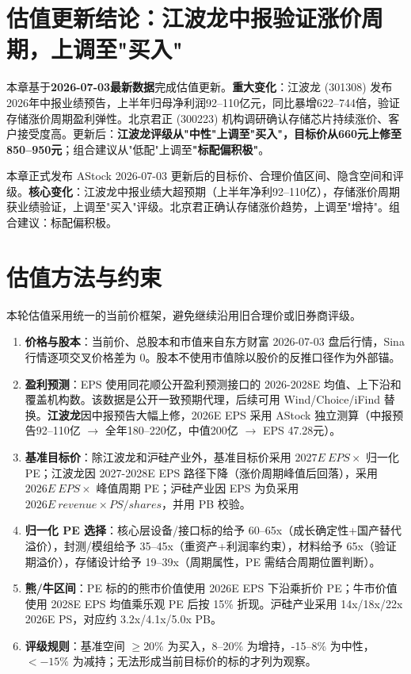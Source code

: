 
\section{估值更新结论：江波龙中报验证涨价周期，上调至"买入"}

本章基于\textbf{2026-07-03最新数据}完成估值更新。\textbf{重大变化}：江波龙 (301308) 发布2026年中报业绩预告，上半年归母净利润92--110亿元，同比暴增622--744倍，验证存储涨价周期盈利弹性。北京君正 (300223) 机构调研确认存储芯片持续涨价、客户接受度高。更新后：\textbf{江波龙评级从"中性"上调至"买入"，目标价从660元上修至850--950元}；组合建议从"低配"上调至\textbf{"标配偏积极"}。

\begin{riskbox}[估值结论]
本章正式发布 AStock 2026-07-03 更新后的目标价、合理价值区间、隐含空间和评级。\textbf{核心变化}：江波龙中报业绩大超预期（上半年净利92--110亿），存储涨价周期获业绩验证，上调至"买入"评级。北京君正确认存储涨价趋势，上调至"增持"。组合建议：标配偏积极。
\end{riskbox}

\section{估值方法与约束}

本轮估值采用统一的当前价框架，避免继续沿用旧合理价或旧券商评级。

\begin{enumerate}[label=(\arabic*)]
  \item \textbf{价格与股本}：当前价、总股本和市值来自东方财富 2026-07-03 盘后行情，Sina 行情逐项交叉价格差为 0。股本不使用市值除以股价的反推口径作为外部锚。
  \item \textbf{盈利预测}：EPS 使用同花顺公开盈利预测接口的 2026-2028E 均值、上下沿和覆盖机构数。该数据是公开一致预期代理，后续可用 Wind/Choice/iFind 替换。\textbf{江波龙}因中报预告大幅上修，2026E EPS 采用 AStock 独立测算（中报预告92--110亿 $\to$ 全年180--220亿，中值200亿 $\to$ EPS 47.28元）。
  \item \textbf{基准目标价}：除江波龙和沪硅产业外，基准目标价采用 \(2027E\ EPS \times\) 归一化 PE；江波龙因 2027-2028E EPS 路径下降（涨价周期峰值后回落），采用 \(2026E\ EPS \times\) 峰值周期 PE；沪硅产业因 EPS 为负采用 \(2026E\ revenue \times PS / shares\)，并用 PB 校验。
  \item \textbf{归一化 PE 选择}：核心层设备/接口标的给予 60--65x（成长确定性+国产替代溢价），封测/模组给予 35--45x（重资产+利润率约束），材料给予 65x（验证期溢价），存储设计给予 19--39x（周期属性，PE 需结合周期位置判断）。
  \item \textbf{熊/牛区间}：PE 标的的熊市价值使用 2026E EPS 下沿乘折价 PE；牛市价值使用 2028E EPS 均值乘乐观 PE 后按 15\% 折现。沪硅产业采用 14x/18x/22x 2026E PS，对应约 3.2x/4.1x/5.0x PB。
  \item \textbf{评级规则}：基准空间 \(\geq\)20\% 为买入，8--20\% 为增持，-15--8\% 为中性，\(<-15\%\) 为减持；无法形成当前目标价的标的才列为观察。
\end{enumerate}

